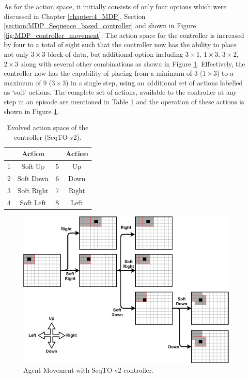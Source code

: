 As for the action space, it initially consists of only four options which were discussed in Chapter \ref{chapter:4_MDP}, Section \ref{section:MDP_Sequence_based_controller} and shown in Figure \ref{fig:MDP_controller_movement}. The action space for the controller is increased by four to a total of eight such that the controller now has the ability to place not only $3 \times 3$ block of data, but additional option including $3 \times 1$, $1 \times 3$, $3 \times 2$, $2 \times 3$ along with several other combinations as shown in Figure \ref{fig:RL_agent_movement}. Effectively, the controller now has the capability of placing from a minimum of 3 ($1 \times 3$) to a maximum of 9 ($3 \times 3$) in a single step, using an additional set of actions labelled as `soft' actions. The complete set of actions, available to the controller at any step in an episode are mentioned in Table \ref{tab:RL_action_options} and the operation of these actions is shown in Figure \ref{fig:RL_agent_movement}. 

\begin{table}[h!]
\centering
\begin{tabular}{|c|c||c|c|}
\hline
\textbf{} & \textbf{Action} & \textbf{} & \textbf{Action}\\ \hline \hline
1         & Soft Up         & 5     & Up\\ \hline
2         & Soft Down       & 6     & Down \\ \hline
3         & Soft Right      & 7     & Right\\ \hline
4         & Soft Left       & 8     & Left\\ \hline
\end{tabular}
\caption{Evolved action space of the controller (SeqTO-v2).}
\label{tab:RL_action_options}
\end{table}

\begin{figure}[h!]
    \centering
    \includegraphics[width=\textwidth]{Figures/Ch_RL/C_core_movement_final400.png}
    \caption{Agent Movement with SeqTO-v2 controller.}
    \label{fig:RL_agent_movement}
\end{figure}

